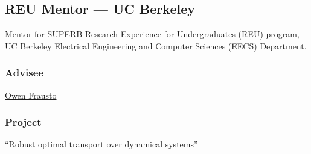 \vspace*{\subsectionskip}

\subsection{REU Mentor --- UC Berkeley}

\begin{adjustwidth}{\sectionwidth}{}Mentor for \href{https://eecs.berkeley.edu/resources/undergrads/research/superb}{SUPERB Research Experience for Undergraduates (REU)} program, UC Berkeley Electrical Engineering and Computer Sciences (EECS) Department.\end{adjustwidth}

\subsubsection{Advisee}
\href{https://www.linkedin.com/in/owen-frausto-39786a217}{Owen Frausto}

\subsubsection{Project}
``Robust optimal transport over dynamical systems''
